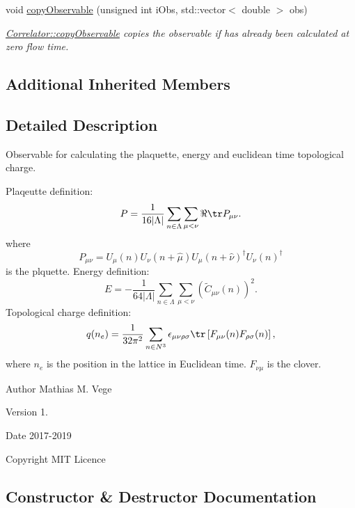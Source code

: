 \begin{DoxyCompactItemize}
void \mbox{\hyperlink{class_master_sampler_topc_x_y_z_a49ef8ccce4bf9473017bbb7c01f1404b}{copy\+Observable}} (unsigned int i\+Obs, std\+::vector$<$ double $>$ obs)
\begin{DoxyCompactList}\small\item\em \mbox{\hyperlink{class_correlator_ac780d8b180294ee4801ede6e6a13f7f4}{Correlator\+::copy\+Observable}} copies the observable if has already been calculated at zero flow time. \end{DoxyCompactList}\end{DoxyCompactItemize}
\subsection*{Additional Inherited Members}


\subsection{Detailed Description}
Observable for calculating the plaquette, energy and euclidean time topological charge. 

Plaqeutte definition\+: \[ P = \frac{1}{16|\Lambda|} \sum_{n\in\Lambda} \sum_{\mu < \nu} \Re \tr P_{\mu\nu}. \] where \[ P_{\mu\nu}=U_\mu(n) U_{\nu}(n+\hat{\mu}) U_{\mu}(n+\hat{\nu})^\dagger U_{\nu} (n)^\dagger \] is the plquette. Energy definition\+: \[ E = -\frac{1}{64|\Lambda|} \sum_{n\in\Lambda} \sum_{\mu<\nu} \left(\tilde{C}_{\mu\nu}(n)\right)^2. \] Topological charge definition\+: \[ q(n_e) = \frac{1}{32\pi^2} \sum_{n\in N^3} \epsilon_{\mu\nu\rho\sigma} \tr\left[F_{\mu\nu}(n)F_{\rho\sigma}(n)\right], \] where $n_e$ is the position in the lattice in Euclidean time. $F_{\nu\mu}$ is the clover.

\begin{DoxyAuthor}{Author}
Mathias M. Vege 
\end{DoxyAuthor}
\begin{DoxyVersion}{Version}
1. 
\end{DoxyVersion}
\begin{DoxyDate}{Date}
2017-\/2019 
\end{DoxyDate}
\begin{DoxyCopyright}{Copyright}
M\+IT Licence 
\end{DoxyCopyright}


\subsection{Constructor \& Destructor Documentation}
\mbox{\label{class_master_sampler_topc_x_y_z_ad8ba8f2c50c66d823c551f71fd62a99b}} 
